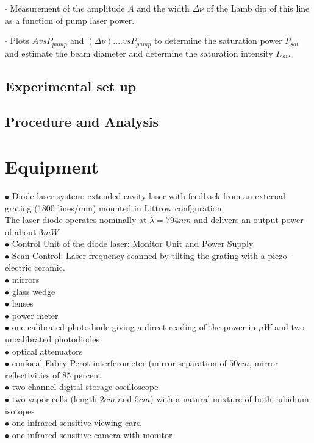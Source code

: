 \documentclass[openany,11pt,a4paper]{book}
\begin{document}
$\cdot$ Measurement of the amplitude $A$ and the width $\Delta\nu$ of the Lamb dip of this line as a function of pump laser
power.

$\cdot$ Plots $A vs P_{pump}$ and $(\Delta\nu).... vs P_{pump}$ to determine the saturation power $P_{sat}$ and estimate the beam diameter and determine the saturation intensity $I_{sat}$.







\section*{ Experimental set up}
\section*{Procedure and Analysis}




\chapter{ Equipment }
$\bullet $  Diode laser system: extended-cavity laser with feedback from an external grating (1800 lines/mm) mounted in Littrow confguration.\\
The laser diode operates nominally at $ \lambda = 794nm $ and delivers an output power of about $3mW$\\
$ \bullet $ Control Unit of the diode laser: Monitor Unit and Power Supply\\ 
$ \bullet $  Scan Control: Laser frequency scanned by tilting the grating with a piezo-electric ceramic.\\ 
$ \bullet $   mirrors\\
$ \bullet $   glass wedge\\
$ \bullet $   lenses \\
$ \bullet $   power meter\\
$ \bullet $   one calibrated photodiode giving a direct reading of the power in $\mu W$ and two uncalibrated photodiodes\\
$ \bullet $   optical attenuators\\ 
$ \bullet $   confocal Fabry-Perot interferometer (mirror separation of $50 cm$, mirror reflectivities of $ 85$ percent\\
$ \bullet $   two-channel digital storage oscilloscope \\
$ \bullet $   two vapor cells (length $2 cm$ and $5 cm$) with a natural mixture of both rubidium isotopes\\
$ \bullet $   one infrared-sensitive viewing card\\ 
$ \bullet $   one infrared-sensitive camera with monitor\\
\end{document}
